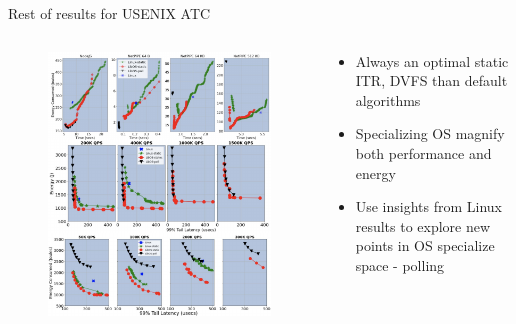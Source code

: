 \documentclass[notes=only,10pt,xcolor=table]{beamer}
\begin{document}
\begin{frame}{Rest of results for USENIX ATC}
\begin{columns}
    \begin{column}{.6\textwidth}
        \begin{figure}
            \includegraphics[width=1\textwidth]{img/atc_collage.pdf}
        \end{figure}
    \end{column}
    \begin{column}{.4\textwidth}
        \begin{itemize}
            \item Always an optimal static ITR, DVFS than default algorithms
            \item Specializing OS magnify both performance and energy
            \item Use insights from Linux results to explore new points in OS specialize space - polling
        \end{itemize}
    \end{column}
\end{columns}  
\end{frame}
\end{document}
